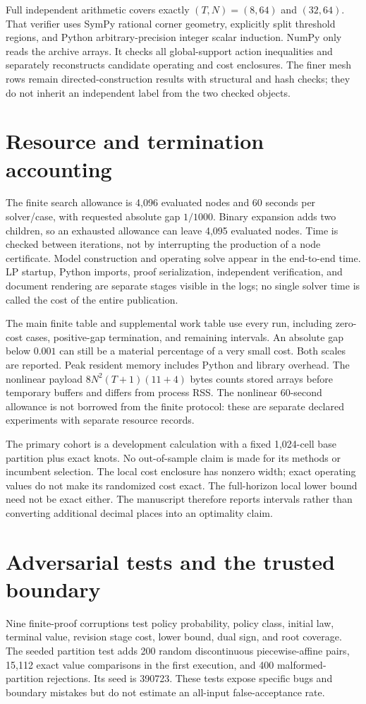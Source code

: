 Full independent arithmetic covers exactly $(T,N)=(8,64)$ and $(32,64)$. That verifier uses SymPy rational corner geometry, explicitly split threshold regions, and Python arbitrary-precision integer scalar induction. NumPy only reads the archive arrays. It checks all global-support action inequalities and separately reconstructs candidate operating and cost enclosures. The finer mesh rows remain directed-construction results with structural and hash checks; they do not inherit an independent label from the two checked objects.

\section{Resource and termination accounting}
The finite search allowance is 4,096 evaluated nodes and 60 seconds per solver/case, with requested absolute gap $1/1000$. Binary expansion adds two children, so an exhausted allowance can leave 4,095 evaluated nodes. Time is checked between iterations, not by interrupting the production of a node certificate. Model construction and operating solve appear in the end-to-end time. LP startup, Python imports, proof serialization, independent verification, and document rendering are separate stages visible in the logs; no single solver time is called the cost of the entire publication.

The main finite table and supplemental work table use every run, including zero-cost cases, positive-gap termination, and remaining intervals. An absolute gap below $0.001$ can still be a material percentage of a very small cost. Both scales are reported. Peak resident memory includes Python and library overhead. The nonlinear payload $8N^2(T+1)(11+4)$ bytes counts stored arrays before temporary buffers and differs from process RSS. The nonlinear 60-second allowance is not borrowed from the finite protocol: these are separate declared experiments with separate resource records.

The primary cohort is a development calculation with a fixed 1,024-cell base partition plus exact knots. No out-of-sample claim is made for its methods or incumbent selection. The local cost enclosure has nonzero width; exact operating values do not make its randomized cost exact. The full-horizon local lower bound need not be exact either. The manuscript therefore reports intervals rather than converting additional decimal places into an optimality claim.

\section{Adversarial tests and the trusted boundary}
Nine finite-proof corruptions test policy probability, policy class, initial law, terminal value, revision stage cost, lower bound, dual sign, and root coverage. The seeded partition test adds 200 random discontinuous piecewise-affine pairs, 15,112 exact value comparisons in the first execution, and 400 malformed-partition rejections. Its seed is 390723. These tests expose specific bugs and boundary mistakes but do not estimate an all-input false-acceptance rate.


